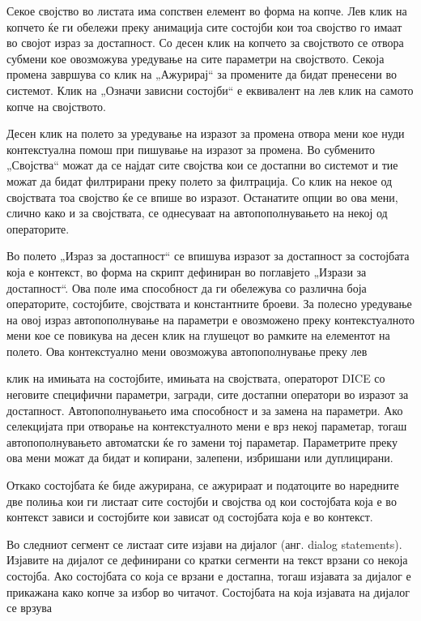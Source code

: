 Секое својство во листата има сопствен елемент во форма на копче. Лев клик на копчето ќе ги обележи преку анимација сите состојби кои тоа својство го имаат во својот израз за достапност. Со десен клик на копчето за својството се отвора субмени кое овозможува уредување на сите параметри на својството. Секоја промена завршува со клик на „Ажурирај“ за промените да бидат пренесени во системот. Клик на „Означи зависни состојби“ е еквивалент на лев клик на самото копче на својството.

Десен клик на полето за уредување на изразот за промена отвора мени кое нуди контекстуална помош при пишување на изразот за промена. Во субменито „Својства“ можат да се најдат сите својства кои се достапни во системот и тие можат да бидат филтрирани преку полето за филтрација. Со клик на некое од својствата тоа својство ќе се впише во изразот. Останатите опции во ова мени, слично како и за својствата, се однесуваат на автопополнувањето на некој од операторите.

Во полето „Израз за достапност“ се впишува изразот за достапност за состојбата која е контекст, во форма на скрипт дефиниран во поглавјето „Изрази за достапност“. Ова поле има способност да ги обележува со различна боја операторите, состојбите, својствата и константните броеви. За полесно уредување на овој израз автопополнување на параметри е овозможено преку контекстуалното мени кое се повикува на десен клик на глушецот во рамките на елементот на полето. Ова контекстуално мени овозможува автопополнување преку лев


клик на имињата на состојбите, имињата на својствата, операторот DICE со неговите специфични параметри, загради, сите достапни оператори во изразот за достапност. Автопополнувањето има способност и за замена на параметри. Ако селекцијата при отворање на контекстуалното мени е врз некој параметар, тогаш автопополнувањето автоматски ќе го замени тој параметар. Параметрите преку ова мени можат да бидат и копирани, залепени, избришани или дуплицирани.

Откако состојбата ќе биде ажурирана, се ажурираат и податоците во наредните две полиња кои ги листаат сите состојби и својства од кои состојбата која е во контекст зависи и состојбите кои зависат од состојбата која е во контекст.

Во следниот сегмент се листаат сите изјави на дијалог (анг. dialog statements). Изјавите на дијалот се дефинирани со кратки сегменти на текст врзани со некоја состојба. Ако состојбата со која се врзани е достапна, тогаш изјавата за дијалог е прикажана како копче за избор во читачот. Состојбата на која изјавата на дијалог се врзува


